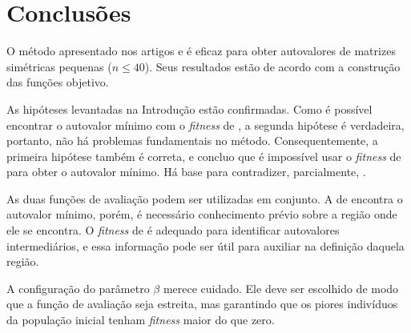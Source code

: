 \chapter{Conclusões}
\label{cap:conclusao}

	O método apresentado nos artigos \cite{metodo2004} e \cite{metodo2011} é eficaz para obter autovalores de matrizes simétricas pequenas ($n \leq 40$). Seus resultados estão de acordo com a construção das funções objetivo.
	
	As hipóteses levantadas na Introdução estão confirmadas. Como é possível encontrar o autovalor mínimo com o \emph{fitness} de \cite{metodo2011}, a segunda hipótese é verdadeira, portanto, não há problemas fundamentais no método. Consequentemente, a primeira hipótese também é correta, e concluo que é impossível usar o \emph{fitness} de \cite{metodo2004} para obter o autovalor mínimo. Há base para contradizer, parcialmente, \cite{metodo2004}.
	
	As duas funções de avaliação podem ser utilizadas em conjunto. A de \cite{metodo2011} encontra o autovalor mínimo, porém, é necessário conhecimento prévio sobre a região onde ele se encontra. O \emph{fitness} de \cite{metodo2004} é adequado para identificar autovalores intermediários, e essa informação pode ser útil para auxiliar na definição daquela região.
	
	A configuração do parâmetro $\beta$ merece cuidado. Ele deve ser escolhido de modo que a função de avaliação seja estreita, mas garantindo que os piores indivíduos da população inicial tenham \emph{fitness} maior do que zero.